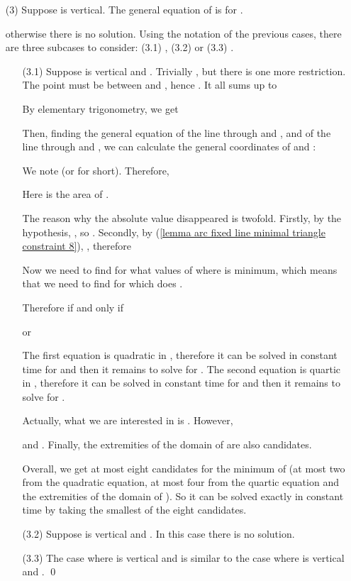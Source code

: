 \documentclass[11pt, oneside]{article}
\begin{document}
\begin{enumerate}
\item[(3)] Suppose  is vertical.
The general equation of  is 
for .

otherwise there is no solution.
Using the notation of the previous cases,
there are three subcases to consider:
(3.1) ,
(3.2) 
or (3.3) .

\begin{enumerate}
\item[(3.1)] Suppose  is vertical and .
Trivially ,
but there is one more restriction.
The point  must be between  and ,
hence .
It all sums up to


By elementary trigonometry,
we get

Then,
finding the general equation of the line through  and ,
and of the line through  and ,
we can calculate the general coordinates of  and :

We note 
(or  for short).
Therefore,

Here is the area  of .


The reason why the absolute value  disappeared
is twofold.
Firstly,
by the hypothesis,
,
so .
Secondly,
by (\ref{lemma arc fixed line minimal triangle constraint 8}),
,
therefore


Now we need to find for what values
of  where  is minimum,
which means that we need to find for which 
does .

Therefore  if and only if

or

The first equation is quadratic in ,
therefore it can be solved in constant time for 
and then it remains to solve for .
The second equation is quartic in ,
therefore it can be solved
in constant time for 
and then it remains to solve for .

Actually,
what we are interested in is .
However,

and .
Finally,
the extremities of the domain of 
are also candidates.

Overall, 
we get at most eight candidates for the minimum of 
(at most two from the quadratic equation, 
at most four from the quartic equation
and the extremities of the domain of ).
So it can be solved exactly in constant time 
by taking the smallest of the eight candidates.

\item[(3.2)] Suppose  is vertical and .
In this case there is no solution.

\item[(3.3)] The case where  is vertical and 
is similar to the case where  is vertical and .
\qed
\end{enumerate}
\end{enumerate}
\end{document}
